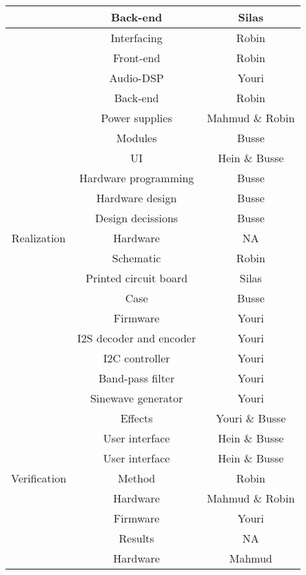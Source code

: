 \begin{justify}
\begin{longtable}{|c|c|c|}
												& Back-end						& Silas						\\ \hline
												& Interfacing					& Robin						\\ \hline
												& Front-end						& Robin						\\ \hline
												& Audio-DSP						& Youri						\\ \hline
												& Back-end						& Robin						\\ \hline
												& Power supplies				& Mahmud \& Robin			\\ \hline
												& Modules						& Busse						\\ \hline
												& UI							& Hein \& Busse				\\ \hline
												& Hardware programming			& Busse						\\ \hline
												& Hardware design				& Busse						\\ \hline
												& Design decissions				& Busse						\\ \hline
	Realization									& Hardware						& NA						\\ \hline
												& Schematic						& Robin						\\ \hline
												& Printed circuit board			& Silas						\\ \hline
												& Case							& Busse						\\ \hline
												& Firmware						& Youri						\\ \hline
												& I2S decoder and encoder		& Youri						\\ \hline
												& I2C controller				& Youri						\\ \hline
												& Band-pass filter				& Youri						\\ \hline
												& Sinewave generator			& Youri						\\ \hline
												& Effects						& Youri \& Busse			\\ \hline
												& User interface				& Hein \& Busse				\\ \hline
												& User interface				& Hein \& Busse				\\ \hline
	Verification								& Method						& Robin						\\ \hline
												& Hardware						& Mahmud \& Robin			\\ \hline
												& Firmware						& Youri						\\ \hline
												& Results						& NA						\\ \hline
												& Hardware						& Mahmud					\\ \hline

\end{longtable}
\end{justify}
